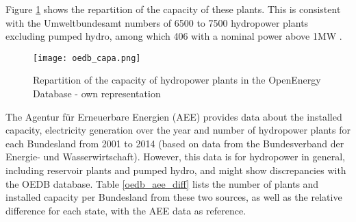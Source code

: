 Figure \ref{oedb_capa} shows the repartition of the capacity of these plants. This is consistent with the Umweltbundesamt numbers of 6500 to 7500 hydropower plants excluding pumped hydro, among which 406 with a nominal power above 1MW \cite{uba_wasserkraft}. 

\begin{figure}[H]
\texttt{[image: oedb\_capa.png]}
\caption[Repartition of the capacity of hydropower plants in the OpenEnergy Database]{Repartition of the capacity of hydropower plants in the OpenEnergy Database - own representation}
\centering
\label{oedb_capa}
\end{figure}


The Agentur für Erneuerbare Energien (AEE) provides data about the installed capacity, electricity generation over the year and number of hydropower plants for each Bundesland \cite{aee} from 2001 to 2014 (based on data from the Bundesverband der Energie- und Wasserwirtschaft). However, this data is for hydropower in general, including reservoir plants and pumped hydro, and might show discrepancies with the OEDB database. Table \ref{oedb_aee_diff} lists the number of plants and installed capacity per Bundesland from these two sources, as well as the relative difference for each state, with the AEE data as reference.  

